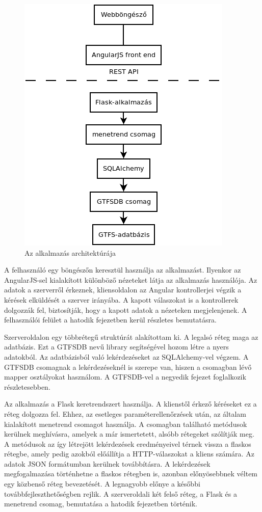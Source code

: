 \begin{figure}[htb]
\centering
\includegraphics[scale=0.7]{kepek/architecture.png}
\caption{Az alkalmazás architektúrája}
\label{fig:architecture}
\end{figure}

A felhasználó egy böngészőn keresztül használja az alkalmazást. Ilyenkor az AngularJS-sel kialakított különböző nézeteket látja az alkalmazás használója. Az adatok a szerverről érkeznek, kliensoldalon az Angular kontrollerjei végzik a kérések elküldését a szerver irányába. A kapott válaszokat is a kontrollerek dolgozzák fel, biztosítják, hogy a kapott adatok a nézeteken megjelenjenek. A felhasználói felület a hatodik fejezetben kerül részletes bemutatásra.

Szerveroldalon egy többrétegű struktúrát alakítottam ki. A legalsó réteg maga az adatbázis. Ezt a GTFSDB nevű library segítségével hozom létre a nyers adatokból. Az adatbázisból való lekérdezéseket az SQLAlchemy-vel végzem. A GTFSDB csomagnak a lekérdezéseknél is szerepe van, hiszen a csomagban lévő mapper osztályokat használom. A GTFSDB-vel a negyedik fejezet foglalkozik részletesebben.

Az alkalmazás a Flask keretrendszert használja. A klienstől érkező kéréseket ez a réteg dolgozza fel. Ehhez, az esetleges paraméterellenőrzések után, az általam kialakított menetrend csomagot használja. A csomagban található metódusok kerülnek meghívásra, amelyek a már ismertetett, alsóbb rétegeket szólítják meg. A metódusok az így létrejött lekérdezések eredményeivel térnek vissza a flaskos rétegbe, amely pedig azokból előállítja a HTTP-válaszokat a kliens számára. Az adatok JSON formátumban kerülnek továbbításra. A lekérdezések megfogalmazása történhetne a flaskos rétegben is, azonban előnyösebbnek véltem egy közbenső réteg bevezetését. A legnagyobb előnye a későbbi továbbfejleszthetőségben rejlik. A szerveroldali két felső réteg, a Flask és a menetrend csomag, bemutatása a hatodik fejezetben történik.
